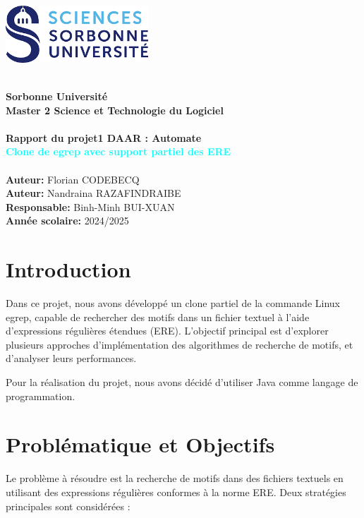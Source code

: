 \documentclass{article}
\begin{document}
\begin{titlepage}
    \centering
    \includegraphics[width=0.4\textwidth]{resourse/logoSorbonne.png}
    \begin{center}
        \hrulefill \\[1cm]
        \Huge\textbf{Sorbonne Université} \\[1cm]
        \Large\textbf{Master 2 Science et Technologie du Logiciel} \\ [1cm]
        \hrulefill \\[2cm]
        \huge\textbf{Rapport du projet1 DAAR : Automate } \\[1cm]
        \huge\textbf{\textcolor{cyan}{Clone de egrep avec support partiel des ERE}} \\[2cm]
        \hrulefill \\[2.5cm]
        \Large\textbf{Auteur:} Florian CODEBECQ\\[0.5cm]
        \Large\textbf{Auteur:} Nandraina RAZAFINDRAIBE\\[0.5cm]
        \Large\textbf{Responsable:} Binh-Minh BUI-XUAN\\[2.5cm]
        \textbf{Année scolaire:} 2024/2025  
    \end{center}
\end{titlepage}

\newpage
\setcounter{page}{1}

\setcounter{section}{0}
\section{Introduction}
Dans ce projet, nous avons développé un clone partiel de la commande Linux egrep, capable de rechercher des motifs dans un fichier textuel à l'aide d'expressions régulières étendues (ERE). L'objectif principal est d'explorer plusieurs approches d'implémentation des algorithmes de recherche de motifs, et d'analyser leurs performances.

Pour la réalisation du projet, nous avons décidé d'utiliser Java comme langage de programmation.

\section{Problématique et Objectifs}
Le problème à résoudre est la recherche de motifs dans des fichiers textuels en utilisant des expressions régulières conformes à la norme ERE. Deux stratégies principales sont considérées :
\end{document}
